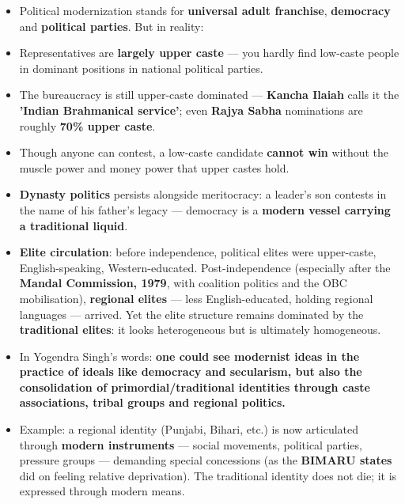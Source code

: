 \begin{KeyConcept}
\begin{itemize}
\item Political modernization stands for \textbf{universal adult franchise}, \textbf{democracy} and \textbf{political parties}. But in reality:
\item Representatives are \textbf{largely upper caste} --- you hardly find low-caste people in dominant positions in national political parties.
\item The bureaucracy is still upper-caste dominated --- \textbf{Kancha Ilaiah} calls it the \textbf{'Indian Brahmanical service'}; even \textbf{Rajya Sabha} nominations are roughly \textbf{70\% upper caste}.
\item Though anyone can contest, a low-caste candidate \textbf{cannot win} without the muscle power and money power that upper castes hold.
\item \textbf{Dynasty politics} persists alongside meritocracy: a leader's son contests in the name of his father's legacy --- democracy is a \textbf{modern vessel carrying a traditional liquid}.
\end{itemize}
\end{KeyConcept}

\begin{KeyConcept}
\begin{itemize}
\item \textbf{Elite circulation}: before independence, political elites were upper-caste, English-speaking, Western-educated. Post-independence (especially after the \textbf{Mandal Commission, 1979}, with coalition politics and the OBC mobilisation), \textbf{regional elites} --- less English-educated, holding regional languages --- arrived. Yet the elite structure remains dominated by the \textbf{traditional elites}: it looks heterogeneous but is ultimately homogeneous.
\item In Yogendra Singh's words: \textbf{one could see modernist ideas in the practice of ideals like democracy and secularism, but also the consolidation of primordial/traditional identities through caste associations, tribal groups and regional politics.}
\item Example: a regional identity (Punjabi, Bihari, etc.) is now articulated through \textbf{modern instruments} --- social movements, political parties, pressure groups --- demanding special concessions (as the \textbf{BIMARU states} did on feeling relative deprivation). The traditional identity does not die; it is expressed through modern means.
\end{itemize}
\end{KeyConcept}

